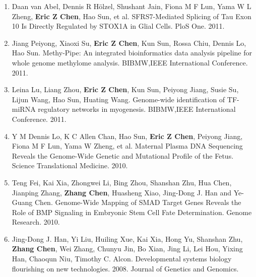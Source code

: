 \documentclass[10pt]{article}
\makeatletter
\newlength{\bibhang}
\newlength{\bibsep}
 {\@listi \global\bibsep\itemsep \global\advance\bibsep by\parsep}
\newenvironment{bibsection}%
        {\begin{enumerate}{}{%
       \setlength{\leftmargin}{\bibhang}%
       \setlength{\itemindent}{-\leftmargin}%
       \setlength{\itemsep}{\bibsep}%
       \setlength{\parsep}{\z@}%
        \setlength{\partopsep}{0pt}%
        \setlength{\topsep}{0pt}}}
        {\end{enumerate}\vspace{-.6\baselineskip}}
\makeatother
\begin{document}
{\begin{bibsection}
   \item Daan van Abel, Dennis R Hölzel, Shushant Jain, Fiona M F Lun, Yama W L Zheng, {\bf Eric Z Chen}, Hao Sun, et al. SFRS7-Mediated Splicing of Tau Exon 10 Is Directly Regulated by STOX1A in Glial Cells. PloS One. 2011.
   
   \item Jiang Peiyong, Xiaoxi Su, {\bf Eric Z Chen}, Kun Sun, Rossa Chiu, Dennis Lo, Hao Sun. Methy-Pipe: An integrated bioinformatics data analysis pipeline for whole genome methylome analysis. BIBMW,IEEE International Conference. 2011.
   
   \item Leina Lu, Liang Zhou, {\bf Eric Z Chen}, Kun Sun, Peiyong Jiang, Susie Su, Lijun Wang, Hao Sun, Huating Wang. Genome-wide identification of TF-miRNA regulatory networks in myogenesis. BIBMW,IEEE International Conference. 2011.
   
   \item Y M Dennis Lo, K C Allen Chan, Hao Sun, {\bf Eric Z Chen}, Peiyong Jiang, Fiona M F Lun, Yama W Zheng, et al. Maternal Plasma DNA Sequencing Reveals the Genome-Wide Genetic and Mutational Profile of the Fetus. Science Translational Medicine. 2010. 
   
   \item Teng Fei, Kai Xia, Zhongwei Li, Bing Zhou, Shanshan Zhu, Hua Chen, Jianping Zhang, {\bf Zhang Chen}, Huasheng Xiao, Jing-Dong J. Han and Ye-Guang Chen. Genome-Wide Mapping of SMAD Target Genes Reveals the Role of BMP Signaling in Embryonic Stem Cell Fate Determination. Genome Research. 2010. 
   
   \item Jing-Dong J. Han, Yi Liu, Huiling Xue, Kai Xia, Hong Yu, Shanshan Zhu, {\bf Zhang Chen}, Wei Zhang, Chunyu Jin, Bo
   Xian, Jing Li, Lei Hou, Yixing Han, Chaoqun Niu, Timothy C. Alcon. Developmental systems biology flourishing on
   new technologies. 2008. Journal of Genetics and Genomics.
  
\end{bibsection}


\end{document}
